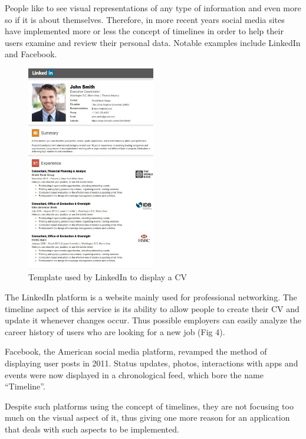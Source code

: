 \documentclass{report}
\begin{document}
People like to see visual representations of any type of information and even more so if it is about themselves. Therefore, in more recent years social media sites have implemented more or less the concept of timelines in order to help their users examine and review their personal data. Notable examples include LinkedIn and Facebook. \par

\begin{figure}
	\vspace*{-1.2cm}
    \centering
    \includegraphics[width=0.5\textwidth]{linkedin}
    \caption{Template used by LinkedIn to display a CV}
	\vspace{-50pt} 
\end{figure}
The LinkedIn platform is a website mainly used for professional networking. The timeline aspect of this service is its ability to allow people to create their CV and update it whenever changes occur. Thus possible employers can easily analyze the career history of users who are looking for a new job (Fig 4).\par

Facebook, the American social media platform, revamped the method of displaying user posts in 2011. Status updates, photos, interactions with apps and events were now displayed in a chronological feed, which bore the name “Timeline”.\par

Despite such platforms using the concept of timelines, they are not focusing too much on the visual aspect of it, thus giving one more reason for an application that deals with such aspects to be implemented.\par
\end{document}

